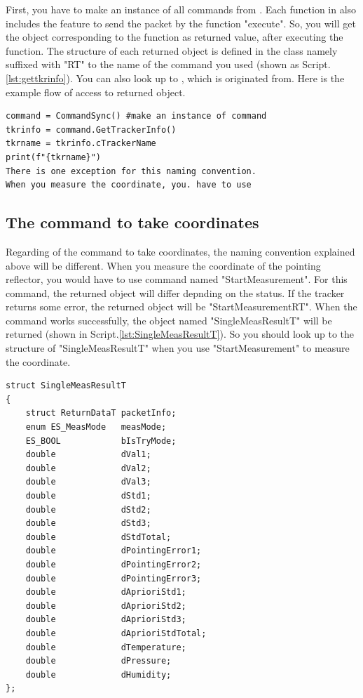 \documentclass[a4paper,12pt]{article}  %
\begin{document}
First, you have to make an instance of all commands from .
Each function in  also includes the feature to send the packet by the function "execute".
So, you will get the object corresponding to the function as returned value, after executing the function.
The structure of each returned object is defined in the class namely suffixed with "RT" to the name of the command you used (shown as Script.\ref{lst:gettkrinfo}).
You can also look up to , which  is originated from.
Here is the example flow of access to returned object.
\begin{lstlisting}[caption={The flow to get the tracker's name}]
command = CommandSync() #make an instance of command
tkrinfo = command.GetTrackerInfo()
tkrname = tkrinfo.cTrackerName
print(f"{tkrname}")
There is one exception for this naming convention.
When you measure the coordinate, you. have to use 
\end{lstlisting}
\subsection{The command to take coordinates}
Regarding of the command to take coordinates, the naming convention explained above will be different.
When you measure the coordinate of the pointing reflector, you would have to use command named "StartMeasurement".
For this command, the returned object will differ depnding on the status.
If the tracker returns some error, the returned object will be "StartMeasurementRT".
When the command works successfully, the object named "SingleMeasResultT" will be returned (shown in Script.\ref{lst:SingleMeasResultT}).
So you should look up to the structure of "SingleMeasResultT" when you use "StartMeasurement" to measure the coordinate.
\begin{lstlisting}[caption={SingleMeasResultT is returned as a response to "StartMeasurement"}, label={lst:SingleMeasResultT}]
struct SingleMeasResultT
{
    struct ReturnDataT packetInfo;
    enum ES_MeasMode   measMode;
    ES_BOOL            bIsTryMode;
    double             dVal1;
    double             dVal2;
    double             dVal3;
    double             dStd1;
    double             dStd2;
    double             dStd3;
    double             dStdTotal;
    double             dPointingError1;
    double             dPointingError2;
    double             dPointingError3;
    double             dAprioriStd1;
    double             dAprioriStd2;
    double             dAprioriStd3;
    double             dAprioriStdTotal;
    double             dTemperature;
    double             dPressure;
    double             dHumidity;
};
\end{lstlisting}
\end{document}
